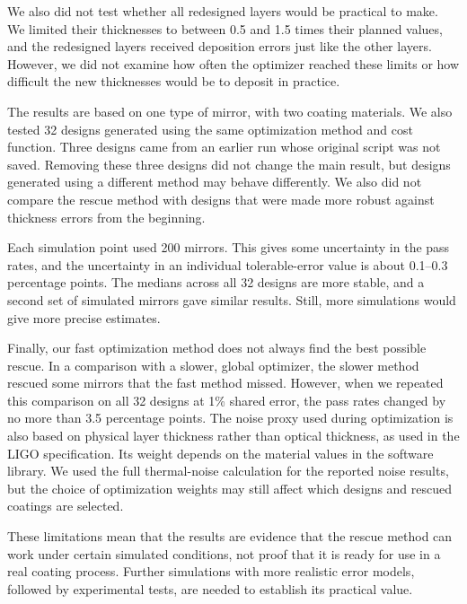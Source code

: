 We also did not test whether all redesigned layers would be practical to make. We limited their thicknesses to between 0.5 and 1.5 times their planned values, and the redesigned layers received deposition errors just like the other layers. However, we did not examine how often the optimizer reached these limits or how difficult the new thicknesses would be to deposit in practice.

The results are based on one type of mirror, with two coating materials. We also tested 32 designs generated using the same optimization method and cost function. Three designs came from an earlier run whose original script was not saved. Removing these three designs did not change the main result, but designs generated using a different method may behave differently. We also did not compare the rescue method with designs that were made more robust against thickness errors from the beginning.

Each simulation point used 200 mirrors. This gives some uncertainty in the pass rates, and the uncertainty in an individual tolerable-error value is about 0.1--0.3 percentage points. The medians across all 32 designs are more stable, and a second set of simulated mirrors gave similar results. Still, more simulations would give more precise estimates.

Finally, our fast optimization method does not always find the best possible rescue. In a comparison with a slower, global optimizer, the slower method rescued some mirrors that the fast method missed. However, when we repeated this comparison on all 32 designs at 1\% shared error, the pass rates changed by no more than 3.5 percentage points. The noise proxy used during optimization is also based on physical layer thickness rather than optical thickness, as used in the LIGO specification. Its weight depends on the material values in the software library. We used the full thermal-noise calculation for the reported noise results, but the choice of optimization weights may still affect which designs and rescued coatings are selected.

These limitations mean that the results are evidence that the rescue method can work under certain simulated conditions, not proof that it is ready for use in a real coating process. Further simulations with more realistic error models, followed by experimental tests, are needed to establish its practical value.
